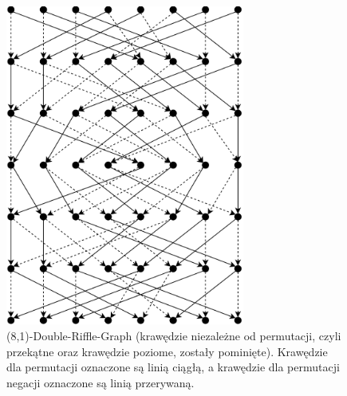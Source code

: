 \begin{figure}
		\centering
		\includegraphics[width=0.7\textwidth]{all_rs1.png}

		\caption{(8,1)-Double-Riffle-Graph (krawędzie niezależne od permutacji, czyli przekątne oraz krawędzie poziome, zostały pominięte). Krawędzie dla permutacji oznaczone są linią ciągłą, a krawędzie dla permutacji negacji oznaczone są linią przerywaną.}
\end{figure}

